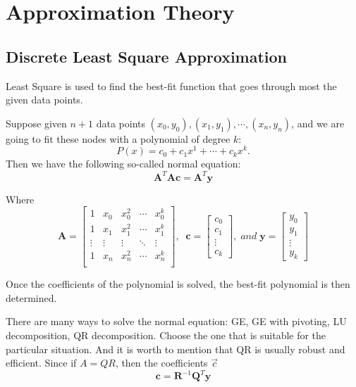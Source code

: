\chapter{Approximation Theory}
\section{Discrete Least Square Approximation}
Least Square is used to find the best-fit function that goes through most the given data points. 

\begin{thm}
	Suppose given $n+1$ data points $(x_0, y_0), (x_1, y_1), \cdots,(x_n, y_n)$, and we are going to fit these nodes with a polynomial of degree $k$:
	\[ P(x) = c_0 + c_1x^1 + \cdots + c_kx^k. \] 
	Then we have the following so-called normal equation:
	\[ \mathbf{A}^T \mathbf{A c} = \mathbf{A}^T\mathbf{y} \]
	
	Where 
	\[ \mathbf{A} = \begin{bmatrix}
	1 & x_0 & x_0^2 & \cdots & x_0^k\\
	1 & x_1 & x_1^2 & \cdots & x_1^k\\
	\vdots & \vdots & \vdots & \ddots & \vdots\\
	1 & x_n & x_n^2 & \cdots & x_n^k\\
	\end{bmatrix},\;\;
	\mathbf{c} = \begin{bmatrix}
	c_0\\ c_1\\ \vdots\\ c_k 
	\end{bmatrix},\;and\;
	\mathbf{y} = \begin{bmatrix}
	y_0\\ y_1\\ \vdots\\ y_k 
	\end{bmatrix} \]
	
	Once the coefficients of the polynomial is solved, the best-fit polynomial is then determined.
\end{thm}

\begin{warning}
	There are many ways to solve the normal equation: GE, GE with pivoting, LU decomposition, QR decomposition. Choose the one that is suitable for the particular situation. And it is worth to mention that QR is usually robust and efficient. Since if $A = QR$, then the coefficients $\vec{c}$
	\[ \mathbf{c} = \mathbf{R}^{-1} \mathbf{Q}^T \mathbf{y} \] 
\end{warning}

